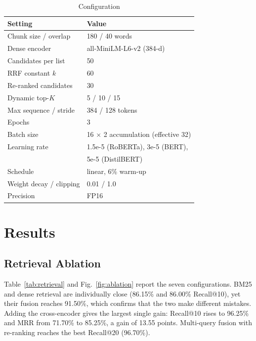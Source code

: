 \documentclass[conference]{IEEEtran}
\begin{document}
\begin{table}[t]
\centering
\caption{Configuration}
\label{tab:hparams}
\footnotesize
\begin{tabular}{@{}ll@{}}
\toprule
\textbf{Setting} & \textbf{Value} \\
\midrule
Chunk size / overlap & 180 / 40 words \\
Dense encoder & all-MiniLM-L6-v2 (384-d) \\
Candidates per list & 50 \\
RRF constant $k$ & 60 \\
Re-ranked candidates & 30 \\
Dynamic top-$K$ & 5 / 10 / 15 \\
\midrule
Max sequence / stride & 384 / 128 tokens \\
Epochs & 3 \\
Batch size & 16 $\times$ 2 accumulation (effective 32) \\
Learning rate & 1.5e-5 (RoBERTa), 3e-5 (BERT), \\
 & 5e-5 (DistilBERT) \\
Schedule & linear, 6\% warm-up \\
Weight decay / clipping & 0.01 / 1.0 \\
Precision & FP16 \\
\bottomrule
\end{tabular}
\end{table}

\section{Results}

\subsection{Retrieval Ablation}
Table~\ref{tab:retrieval} and Fig.~\ref{fig:ablation} report the seven configurations. BM25 and
dense retrieval are individually close (86.15\% and 86.00\% Recall@10), yet their fusion reaches
91.50\%, which confirms that the two make different mistakes. Adding the cross-encoder gives the
largest single gain: Recall@10 rises to 96.25\% and MRR from 71.70\% to 85.25\%, a gain of 13.55
points. Multi-query fusion with re-ranking reaches the best Recall@20 (96.70\%).
\end{document}
